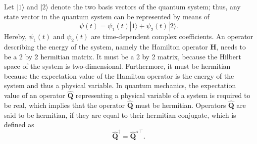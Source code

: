 \documentclass{report}
\numberwithin{tm}{section}
\newcommand\matr[1]{\ensuremath{\boldsymbol{\mathbf{#1}}}}
\begin{document}
Let $|1\rangle$ and $|2\rangle$ denote the two basis vectors of the quantum system; thus, any state vector in the quantum system can be represented by means of \begin{equation}
	\psi(t) = \psi_1(t)|1\rangle + \psi_2(t)|2\rangle.
\end{equation} Hereby, $\psi_1(t)$ and $\psi_2(t)$ are time-dependent complex coefficients. An operator describing the energy of the system, namely the Hamilton operator $\matr{H}$, needs to be a 2 by 2 hermitian matrix. It must be a 2 by 2 matrix, because the Hilbert space of the system is two-dimensional. Furthermore, it must be hermitian because the expectation value of the Hamilton operator is the energy of the system and thus a physical variable. In quantum mechanics, the expectation value of an operator $\hat{\matr{Q}}$ representing a physical variable of a system is required to be real, which implies that the operator $\hat{\matr{Q}}$ must be hermitian. Operators $\hat{\matr{Q}}$ are said to be hermitian, if they are equal to their hermitian conjugate, which is defined as \begin{equation}
\hat{\matr{Q}}^\dagger = \hat{\matr{Q}}^{\star\,\top}.
\end{equation}
\end{document}

